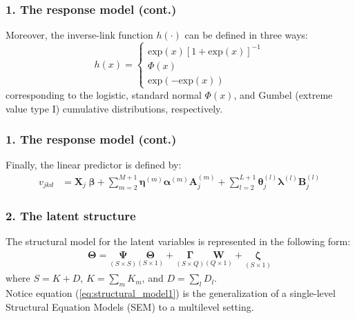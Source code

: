 \documentclass[arial,12pt,xcolor=dvipsnames]{beamer}
\begin{document}
%
\begin{frame}
	\frametitle{1. The response model (cont.)}
	Moreover, the inverse-link function $h(\cdot)$ can be defined in three ways:
	\begin{equation} \label{eq:response_dich1}
		h(x) = 
		\begin{cases}
			\text{exp}(x)[1 + \text{exp}(x)]^{-1} \\
			\Phi(x)  \\
			\text{exp}(-\text{exp}(x))
		\end{cases}
	\end{equation}
	\noindent corresponding to the logistic, standard normal $\Phi(x)$, and Gumbel (extreme value type I) cumulative distributions, respectively.
\end{frame}
%
\begin{frame}
	\frametitle{1. The response model (cont.)}
	Finally, the linear predictor is defined by:
	\begin{equation} \label{eq:linear_predictor2}
		\begin{split}
			v_{jkd} &= \mathbf{X}_{j} \; \pmb{\beta} + \sum_{m=2}^{M+1} \pmb{\eta}^{(m)} \pmb{\alpha}^{(m)} \mathbf{A}_{j}^{(m)} + \sum_{l=2}^{L+1} \pmb{\theta}_{j}^{(l)} \pmb{\lambda}^{(l)} \mathbf{B}_{j}^{(l)}
		\end{split}
	\end{equation}
\end{frame}
%
\begin{frame}
	\frametitle{2. The latent structure}
	The structural model for the latent variables is represented in the following form:
	\begin{equation} \label{eq:structural_model1}
		\begin{split}
			\pmb{\Theta} = \underset{(S \times S)}{\pmb{\Psi}} \underset{(S \times 1)}{\pmb{\Theta}} + \underset{(S \times Q)}{\pmb{\Gamma}} \underset{(Q \times 1)}{\mathbf{W}} + \underset{(S \times 1)}{\pmb{\zeta}}
		\end{split}
	\end{equation}
	where $S=K+D$, $K = \sum_{m} K_{m}$, and $D = \sum_{l} D_{l}$. \\
	\vspace{0.3cm} Notice equation (\ref{eq:structural_model1}) is the generalization of a single-level Structural Equation Models (SEM) to a multilevel setting.
\end{frame}
%
\end{document}
